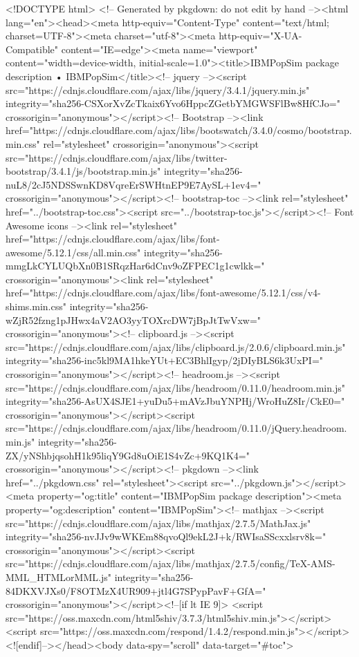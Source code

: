 <!DOCTYPE html>
<!-- Generated by pkgdown: do not edit by hand --><html lang="en"><head><meta http-equiv="Content-Type" content="text/html; charset=UTF-8"><meta charset="utf-8"><meta http-equiv="X-UA-Compatible" content="IE=edge"><meta name="viewport" content="width=device-width, initial-scale=1.0"><title>IBMPopSim package description • IBMPopSim</title><!-- jquery --><script src="https://cdnjs.cloudflare.com/ajax/libs/jquery/3.4.1/jquery.min.js" integrity="sha256-CSXorXvZcTkaix6Yvo6HppcZGetbYMGWSFlBw8HfCJo=" crossorigin="anonymous"></script><!-- Bootstrap --><link href="https://cdnjs.cloudflare.com/ajax/libs/bootswatch/3.4.0/cosmo/bootstrap.min.css" rel="stylesheet" crossorigin="anonymous"><script src="https://cdnjs.cloudflare.com/ajax/libs/twitter-bootstrap/3.4.1/js/bootstrap.min.js" integrity="sha256-nuL8/2cJ5NDSSwnKD8VqreErSWHtnEP9E7AySL+1ev4=" crossorigin="anonymous"></script><!-- bootstrap-toc --><link rel="stylesheet" href="../bootstrap-toc.css"><script src="../bootstrap-toc.js"></script><!-- Font Awesome icons --><link rel="stylesheet" href="https://cdnjs.cloudflare.com/ajax/libs/font-awesome/5.12.1/css/all.min.css" integrity="sha256-mmgLkCYLUQbXn0B1SRqzHar6dCnv9oZFPEC1g1cwlkk=" crossorigin="anonymous"><link rel="stylesheet" href="https://cdnjs.cloudflare.com/ajax/libs/font-awesome/5.12.1/css/v4-shims.min.css" integrity="sha256-wZjR52fzng1pJHwx4aV2AO3yyTOXrcDW7jBpJtTwVxw=" crossorigin="anonymous"><!-- clipboard.js --><script src="https://cdnjs.cloudflare.com/ajax/libs/clipboard.js/2.0.6/clipboard.min.js" integrity="sha256-inc5kl9MA1hkeYUt+EC3BhlIgyp/2jDIyBLS6k3UxPI=" crossorigin="anonymous"></script><!-- headroom.js --><script src="https://cdnjs.cloudflare.com/ajax/libs/headroom/0.11.0/headroom.min.js" integrity="sha256-AsUX4SJE1+yuDu5+mAVzJbuYNPHj/WroHuZ8Ir/CkE0=" crossorigin="anonymous"></script><script src="https://cdnjs.cloudflare.com/ajax/libs/headroom/0.11.0/jQuery.headroom.min.js" integrity="sha256-ZX/yNShbjqsohH1k95liqY9Gd8uOiE1S4vZc+9KQ1K4=" crossorigin="anonymous"></script><!-- pkgdown --><link href="../pkgdown.css" rel="stylesheet"><script src="../pkgdown.js"></script><meta property="og:title" content="IBMPopSim package description"><meta property="og:description" content="IBMPopSim"><!-- mathjax --><script src="https://cdnjs.cloudflare.com/ajax/libs/mathjax/2.7.5/MathJax.js" integrity="sha256-nvJJv9wWKEm88qvoQl9ekL2J+k/RWIsaSScxxlsrv8k=" crossorigin="anonymous"></script><script src="https://cdnjs.cloudflare.com/ajax/libs/mathjax/2.7.5/config/TeX-AMS-MML_HTMLorMML.js" integrity="sha256-84DKXVJXs0/F8OTMzX4UR909+jtl4G7SPypPavF+GfA=" crossorigin="anonymous"></script><!--[if lt IE 9]>
<script src="https://oss.maxcdn.com/html5shiv/3.7.3/html5shiv.min.js"></script>
<script src="https://oss.maxcdn.com/respond/1.4.2/respond.min.js"></script>
<![endif]--></head><body data-spy="scroll" data-target="#toc">
    

